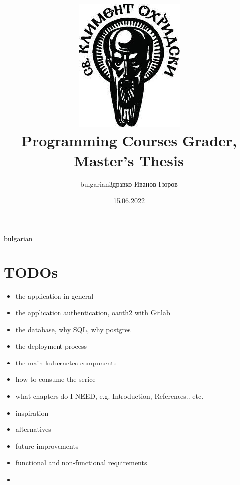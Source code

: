 \documentclass[12pt,a4paper]{report}
\title{\includegraphics[scale=0.5]{su_logo.jpg}\\Programming Courses Grader, Master's Thesis}
\author{\begin{otherlanguage*}{bulgarian}{Здравко Иванов Гюров}\end{otherlanguage*}}
\date{15.06.2022}
\begin{document}
\begin{otherlanguage*}{bulgarian}
\maketitle

\section{TODOs}
\begin{itemize}
\item the application in general
\item the application authentication, oauth2 with Gitlab
\item the database, why SQL, why postgres
\item the deployment process
\item the main kubernetes components
\item how to consume the serice
\item what chapters do I NEED, e.g. Introduction, References.. etc.
\item inspiration
\item alternatives
\item future improvements
\item functional and non-functional requirements
\item 
\end{itemize}

\end{otherlanguage*}
\end{document}
